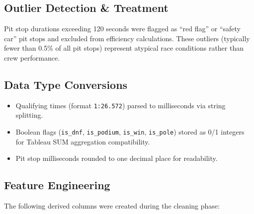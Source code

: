 \documentclass[12pt, a4paper]{article}
\begin{document}
\subsection{Outlier Detection \& Treatment}
Pit stop durations exceeding 120 seconds were flagged as ``red flag'' or ``safety car'' pit stops and excluded from efficiency calculations. These outliers (typically fewer than 0.5\% of all pit stops) represent atypical race conditions rather than crew performance.

\subsection{Data Type Conversions}
\begin{itemize}
    \item Qualifying times (format \texttt{1:26.572}) parsed to milliseconds via string splitting.
    \item Boolean flags (\texttt{is\_dnf}, \texttt{is\_podium}, \texttt{is\_win}, \texttt{is\_pole}) stored as 0/1 integers for Tableau SUM aggregation compatibility.
    \item Pit stop milliseconds rounded to one decimal place for readability.
\end{itemize}

\subsection{Feature Engineering}
The following derived columns were created during the cleaning phase:
\end{document}
